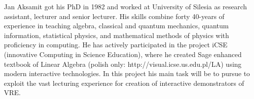 
\begin{participant}[type=PI,PM=12,salary=1400,gender=male]{Jan Aksamit}
got his PhD in 1982 and worked at University of Silesia as research
assistant, lecturer and senior lecturer. His skills combine forty
40-years of experience in teaching algebra, classical and quantum
mechanics, quantum information, statistical physics, and mathematical
methods of physics with proficiency in computing. He has actively
participated in the project iCSE (innovative Computing in Science
Education), where he created Sage enhanced textbook of Linear Algebra
(polish only: http://visual.icse.us.edu.pl/LA) using modern
interactive technologies. In this project his main task will be to
pursue to exploit the vast lecturing experience for creation of
interactive demonstrators of VRE.

\end{participant}

